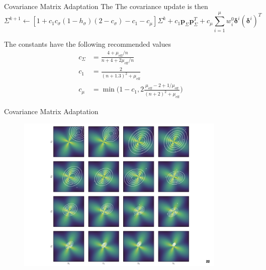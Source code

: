 \documentclass{beamer}
\begin{document}
\begin{frame}{Covariance Matrix Adaptation}
The The covariance update is then
\begin{equation*}
    \Sigma^{k+1} \leftarrow [1 + c_1 c_\sigma(1-h_\sigma)(2 - c_\sigma) - c_1 - c_\mu]\Sigma^k 
    + c_1 \boldsymbol{p}_\Sigma \boldsymbol{p}_\Sigma^T + c_\mu \sum_{i=1}^\mu w_i^0 \boldsymbol{\delta}^i (\boldsymbol{\delta}^i)^T
\end{equation*}

The constants have the following recommended values
\begin{equation*}
    \begin{split}
    c_\Sigma &= \frac{4+\mu_{\textrm{eff}}/n}{n+4+2\mu_{\textrm{eff}}/n}\\
    c_1 &= \frac{2}{(n+1.3)^2 + \mu_{\textrm{eff}}} \\
    c_\mu &= \min \bigg( 1-c_1,  2\frac{\mu_{\textrm{eff}}-2+1/\mu_{\textrm{eff}}} {(n+2)^2 + \mu_{\textrm{eff}} } \bigg)
    \end{split}
\end{equation*}

\end{frame}

\begin{frame}{Covariance Matrix Adaptation}
\begin{figure}
\centering
\includegraphics[width=100mm]{Figs/CMA.jpeg}
\end{figure}   
\end{frame}
\end{document}
